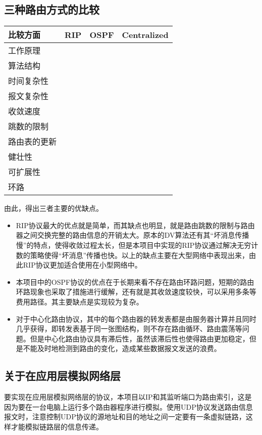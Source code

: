 \documentclass[15pt]{ctexart}
\begin{document}
	\subsection{三种路由方式的比较} %
	\label{sub:三种路由方式的比较}
		\begin{table}[H]
			\begin{tabular}{|l|l|l|l|}
				\hline
				比较方面 & RIP & OSPF & Centralized \\
				\hline
				工作原理 &  &  &  \\
				\hline
				算法结构 &  &  &  \\
				\hline
				时间复杂性 &  &  &  \\
				\hline
				报文复杂性 &  &  &  \\
				\hline
				收敛速度 &  &  &  \\
				\hline
				跳数的限制 &  &  &  \\
				\hline
				路由表的更新 &  &  &  \\
				\hline
				健壮性 &  &  &  \\
				\hline
				可扩展性 &  &  &  \\
				\hline
				环路 &  &  &  \\
				\hline
			\end{tabular}
		\end{table}
		由此，得出三者主要的优缺点。
		\begin{itemize}
			\item RIP协议最大的优点就是简单，而其缺点也明显，就是路由跳数的限制与路由器之间交换完整的路由信息的开销太大。原本的DV算法还有其“坏消息传播慢”的特点，使得收敛过程太长，但是本项目中实现的RIP协议通过解决无穷计数的策略使得“坏消息”传播也快。以上的缺点主要在大型网络中表现出来，由此RIP协议更加适合使用在小型网络中。
			\item 本项目中的OSPF协议的优点在于长期来看不存在路由环路问题，短期的路由环路现象也采取了措施进行缓解，还有就是其收敛速度较快，可以采用多条等费用路径。其主要缺点是实现较为复杂。
			\item 对于中心化路由协议，其中的每个路由器的转发表都是由服务器计算并且同时几乎获得，即转发表基于同一张图结构，则不存在路由循环、路由震荡等问题。但是中心化路由协议具有滞后性，虽然该滞后性也使得路由更加稳定，但是不能及时地检测到路由的变化，造成某些数据报文发送的浪费。
		\end{itemize}
	\subsection{关于在应用层模拟网络层} %
	\label{sub:关于在应用层模拟网络层协议}
		要实现在应用层模拟网络层的协议，本项目以IP和其监听端口为路由索引，这是因为要在一台电脑上运行多个路由器程序进行模拟。使用UDP协议发送路由信息报文时，注意控制UDP协议的源地址和目的地址之间一定要有一条虚拟链路，这样才能模拟链路层的信息传递。
\end{document}
